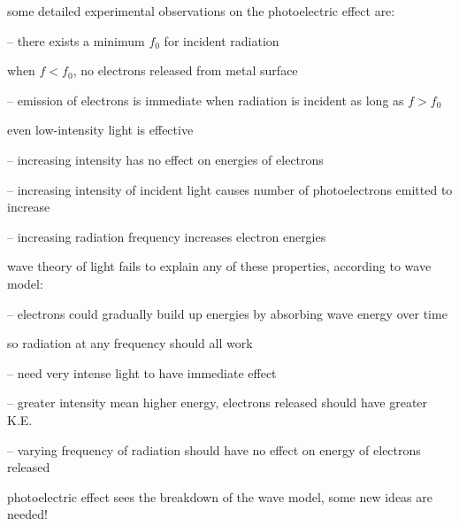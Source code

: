 \cmt some detailed experimental observations on the photoelectric effect are:

\begin{compactitem}
	\item[--] there exists a minimum  $f_0$ for incident radiation
	
	when $f<f_0$, no electrons released from metal surface
	
	\item[--] emission of electrons is immediate when radiation is incident as long as $f>f_0$
	
	even low-intensity light is effective
	
	\item[--] increasing intensity has no effect on energies of electrons
	
	\item[--] increasing intensity of incident light causes number of photoelectrons emitted to increase
	
	\item[--] increasing radiation frequency increases electron energies
\end{compactitem}

\cmt wave theory of light fails to explain any of these properties, according to wave model:

\begin{compactitem}
	
	\item[--] electrons could gradually build up energies by absorbing wave energy over time
	
	so radiation at any frequency should all work 
	
	
	\item[--] need very intense light to have immediate effect
	
	\item[--] greater intensity mean higher energy, electrons released should have greater K.E.
	
	\item[--] varying frequency of radiation should have no effect on energy of electrons released
\end{compactitem}

photoelectric effect sees the breakdown of the wave model, some new ideas are needed!

\newpage






